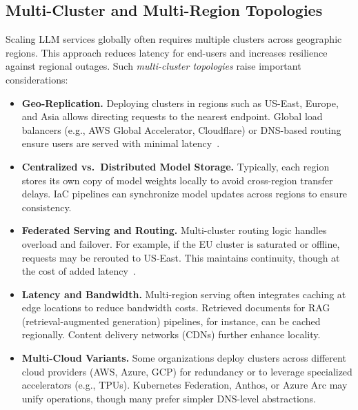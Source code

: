 \subsection{Multi-Cluster and Multi-Region Topologies}
\label{sec:deploy-multicluster}

Scaling LLM services globally often requires multiple clusters across geographic regions. 
This approach reduces latency for end-users and increases resilience against regional outages. 
Such \emph{multi-cluster topologies} raise important considerations:

\begin{itemize}
    \item \textbf{Geo-Replication.}  
    Deploying clusters in regions such as US-East, Europe, and Asia allows directing requests to the nearest endpoint. 
    Global load balancers (e.g., AWS Global Accelerator, Cloudflare) or DNS-based routing ensure users are served with minimal latency~\cite{terraform-docs,opa-docs}.

    \item \textbf{Centralized vs.\ Distributed Model Storage.}  
    Typically, each region stores its own copy of model weights locally to avoid cross-region transfer delays. 
    IaC pipelines can synchronize model updates across regions to ensure consistency.

    \item \textbf{Federated Serving and Routing.}  
    Multi-cluster routing logic handles overload and failover. 
    For example, if the EU cluster is saturated or offline, requests may be rerouted to US-East. 
    This maintains continuity, though at the cost of added latency~\cite{pulumi-docs}. 

    \item \textbf{Latency and Bandwidth.}  
    Multi-region serving often integrates caching at edge locations to reduce bandwidth costs. 
    Retrieved documents for RAG (retrieval-augmented generation) pipelines, for instance, can be cached regionally. 
    Content delivery networks (CDNs) further enhance locality.

    \item \textbf{Multi-Cloud Variants.}  
    Some organizations deploy clusters across different cloud providers (AWS, Azure, GCP) for redundancy or to leverage specialized accelerators (e.g., TPUs). 
    Kubernetes Federation, Anthos, or Azure Arc may unify operations, though many prefer simpler DNS-level abstractions.
\end{itemize}

